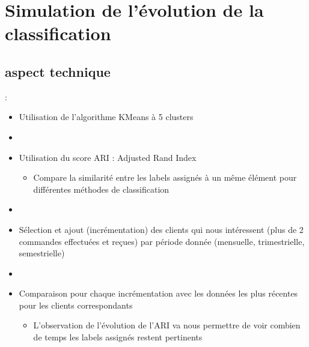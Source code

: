 \documentclass[8pt,aspectratio=169,hyperref={unicode=true}]{beamer}
\begin{document}
\section{Simulation de l'évolution de la classification}
\subsection{aspect technique}
\begin{frame}{\insertsection: \insertsubsection}
    \begin{itemize}
        \item Utilisation de l'algorithme KMeans à 5 clusters
        \item[]
        \item Utilisation du score ARI : Adjusted Rand Index
        \begin{itemize}
            \item Compare la similarité entre les labels assignés à un même élément pour différentes méthodes de classification
        \end{itemize}
        \item[]
        \item Sélection et ajout (incrémentation) des clients qui nous intéressent (plus de 2 commandes effectuées et reçues) par période donnée (mensuelle, trimestrielle, semestrielle)
        \item[]
        \item Comparaison pour chaque incrémentation avec les données les plus récentes pour les clients correspondants
        \begin{itemize}
            \item L'observation de l'évolution de l'ARI va nous permettre de voir combien de temps les labels assignés restent pertinents
        \end{itemize}
    \end{itemize}
\end{frame}
\end{document}
